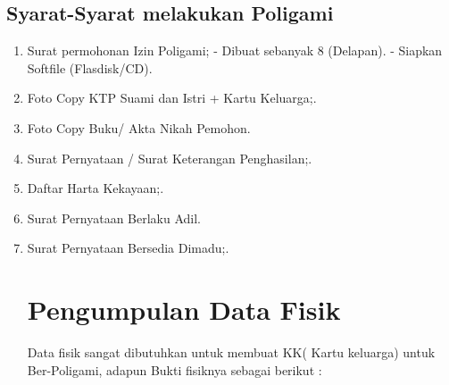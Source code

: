 \subsection{Syarat-Syarat melakukan Poligami}
\begin{enumerate}
\item Surat permohonan Izin Poligami;
-	Dibuat sebanyak 8 (Delapan).
-	Siapkan Softfile (Flasdisk/CD).
\item Foto Copy KTP Suami dan Istri + Kartu Keluarga;.
\item Foto Copy Buku/ Akta Nikah Pemohon.
\item Surat Pernyataan / Surat Keterangan Penghasilan;.
\item Daftar Harta Kekayaan;.
\item Surat Pernyataan Berlaku Adil.
\item Surat Pernyataan Bersedia Dimadu;.
\section{Pengumpulan Data Fisik}
Data fisik sangat dibutuhkan untuk membuat KK(
Kartu keluarga) untuk Ber-Poligami, adapun Bukti fisiknya sebagai berikut :  
\end{enumerate}
